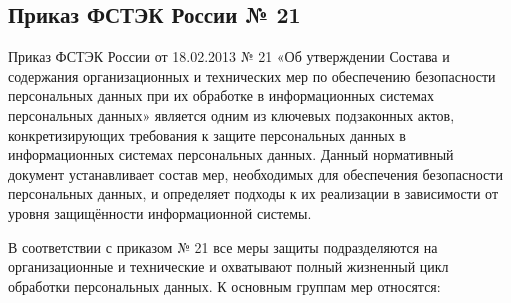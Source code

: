 \subsection{Приказ ФСТЭК России № 21}

Приказ ФСТЭК России от 18.02.2013 № 21 «Об утверждении Состава и содержания организационных и технических мер по обеспечению безопасности персональных данных при их обработке в информационных системах персональных данных» \cite{FSTEK21} является одним из ключевых подзаконных актов, конкретизирующих требования к защите персональных данных в информационных системах персональных данных. Данный нормативный документ устанавливает состав мер, необходимых для обеспечения безопасности персональных данных, и определяет подходы к их реализации в зависимости от уровня защищённости информационной системы.

В соответствии с приказом № 21 все меры защиты подразделяются на организационные и технические и охватывают полный жизненный цикл обработки персональных данных. К основным группам мер относятся:

